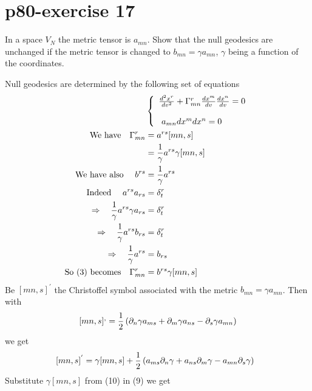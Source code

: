 \section{p80-exercise 17}
\begin{tcolorbox}
In a space $V_N$ the metric tensor is $a_{mn}$. Show that the null geodesics are unchanged if the metric tensor is changed to $b_{mn} = \gamma a_{mn} $, $\gamma$ being a function of the coordinates.
\end{tcolorbox}
Null geodesics are determined by the following set of equations
\begin{align}
\ & \left \{  \begin {array}{l}
\dv[2]{x^r}{v} + \Gamma^r_{mn}\dv{x^m}{v}\dv{x^n}{v} = 0\\\\
\ a_{mn}dx^mdx^n =0
\end{array}\right.\\
\text{We have}\quad  \Gamma^r_{mn} & = a^{rs}[mn,s]\\
\ & = \frac{1}{\gamma}a^{rs}\gamma[mn,s]\\
\text{We have also }\quad  b^{rs} & = \frac{1}{\gamma}a^{rs}\\
\text{Indeed }\quad  a^{rs}a_{rs}&= \delta^r_t\\
\Rightarrow\quad  \frac{1}{\gamma}a^{rs}\gamma a_{rs}&= \delta^r_t\\
\Rightarrow\quad  \frac{1}{\gamma}a^{rs}b_{rs}&= \delta^r_t\\
\Rightarrow\quad  \frac{1}{\gamma}a^{rs} &= b_{rs}\\
\text{So (3) becomes}\quad  \Gamma^r_{mn} & =b^{rs}\gamma[mn,s]
\end{align}
Be $ [mn,s]^{'} $ the Christoffel symbol associated with the metric $b_{mn}= \gamma a_{mn}$. Then with  $$[mn,s]^, = \frac{1}{2} \left(\partial_n \gamma a_{ms}+\partial_m \gamma a_{ns}-\partial_s \gamma a_{mn} \right)$$ we get
\begin{align}
\ [mn,s]^{'} &= \gamma [mn,s] + \frac{1}{2}\left( a_{ms}\partial_n \gamma+a_{ns}\partial_m \gamma-a_{mn}\partial_s \gamma \right)
\end{align}
Substitute $\gamma [mn,s]$ from (10) in (9) we get

